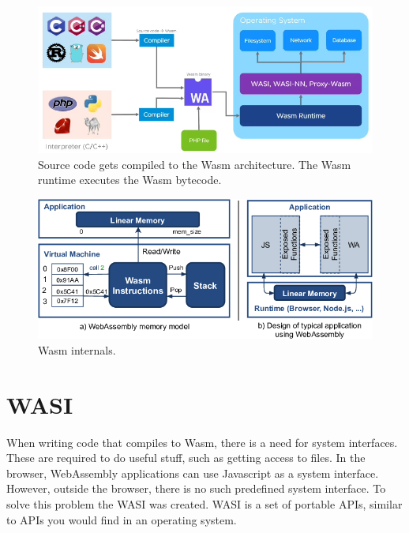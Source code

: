 \begin{figure}[H]
  \centering
  \includegraphics[width=1\textwidth]{images/wasm_compiler.png}
  \caption{Source code gets compiled to the Wasm architecture. The Wasm runtime executes the Wasm bytecode. \cite{docker_without_containers}}
  \label{fig:wasm_compiler_frontend}
\end{figure}

\begin{figure}[H]
  \centering
  \includegraphics[width=1\textwidth]{images/WebAssembly-high-level-architecture.png}
  \caption{Wasm internals. \cite{wasm_vulnerabilities}}
  \label{fig:wasm_high_level}
\end{figure}

\section{\acrshort{WASI}}

When writing code that compiles to Wasm, there is a need for system interfaces. These are required to do useful stuff, such as getting access to files. In the browser, WebAssembly applications can use Javascript as a system interface. However, outside the browser, there is no such predefined system interface. To solve this problem the \acrfull{WASI} was created. \acrshort{WASI} is a set of portable APIs, similar to APIs you would find in an operating system.

